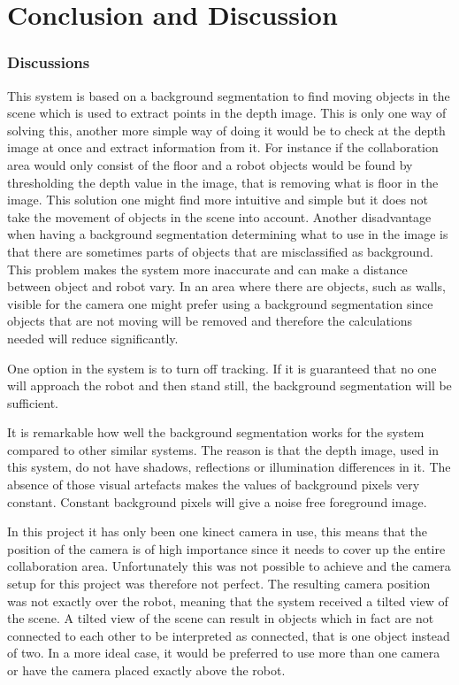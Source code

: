 \section{Conclusion and Discussion}  

\subsubsection{Discussions}
This system is based on a background segmentation to find moving objects in the scene which is used to extract points in the depth image. This is only one way of solving this, another more simple way of doing it would be to check at the depth image at once and extract information from it. For instance if the collaboration area would only consist of the floor and a robot objects would be found by thresholding the depth value in the image, that is removing what is floor in the image. This solution one might find more intuitive and simple but it does not take the movement of objects in the scene into account. Another disadvantage when having a background segmentation determining what to use in the image is that there are sometimes parts of objects that are misclassified as background. This problem makes the system more inaccurate and can make a distance between object and robot vary. In an area where there are objects, such as walls, visible for the camera one might prefer using a background segmentation since objects that are not moving will be removed and therefore the calculations needed will reduce significantly.  

One option in the system is to turn off tracking. If it is guaranteed that no one will approach the robot and then stand still, the background segmentation will be sufficient.  

It is remarkable how well the background segmentation works for the system compared to other similar systems. The reason is that the depth image, used in this system, do not have shadows, reflections or illumination differences in it. The absence of those visual artefacts makes the values of background pixels very constant. Constant background pixels will give a noise free foreground image. 

In this project it has only been one kinect camera in use, this means that the position of the camera is of high importance since it needs to cover up the entire collaboration area. Unfortunately this was not possible to achieve and the camera setup for this project was therefore not perfect. The resulting camera position was not exactly over the robot, meaning that the system received a tilted view of the scene. A tilted view of the scene can result in objects which in fact are not connected to each other to be interpreted as connected, that is one object instead of two. In a more ideal case, it would be preferred to use more than one camera or have the camera placed exactly above the robot.

